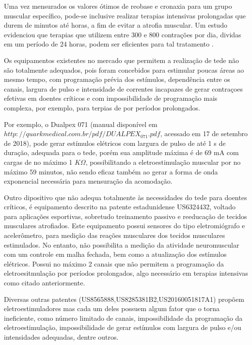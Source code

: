 Uma vez mensurados os valores ótimos de reobase e cronaxia para um grupo muscular específico, pode-se inclusive realizar terapias intensivas prolongadas que durem de minutos até horas, a fim de evitar a atrofia muscular. Um estudo evidenciou que terapias que utilizem entre 300 e 800 contrações por dia, dividas em um período de 24 horas, podem ser eficientes para tal tratamento .

Os equipamentos existentes no mercado que permitem a realização de \ac{tede} não são totalmente adequados, pois foram concebidos para estimular poucas áreas ao mesmo tempo, com programação prévia dos estímulos, dependência entre os canais, largura de pulso e intensidade de correntes incapazes de gerar contraçoes efetivas em doentes críticos e com impossibilidade de programação mais complexa, por exemplo, para terpias de por períodos prolongados. 

Por exemplo, o Dualpex 071 (manual disponível em $http://quarkmedical.com.br/pdf/DUALPEX_071.pdf$, acessado em 17 de setembro de 2018), pode gerar estímulos elétricos com largura de pulso de até 1 s de duração, adequada para o \ac{tede}, porém sua amplitude máxima é de 69 mA com cargas de no máximo 1 $K\Omega$, possibilitando a eletroestimulação muscular por no máximo 59 minutos, não sendo eficaz também ao gerar a forma de onda exponencial necessária para mensuração da acomodação.

Outro dipositivo que não adequa totalmente às necessidades do \ac{tede} para doentes críticos, é equipamento descrito na patente estadunidense US6324432, voltado para aplicações esportivas, sobretudo treinamento passivo e reeducação de tecidos musculares atrofiados. Este equipamento possui sensores do tipo eletromiógrafo e acelerômetro, para medição das reações musculares dos tecidos musculares estimulados. No entanto, não possibilita a medição da atividade neuromuscular com um controle em malha fechada, bem como a atualização dos estímulos elétricos. Possui no máximo 2 canais que não permitem a programação da eletroesitmulação por períodos prolongados, algo necessário em terapias intensivas como citado anteriormente.

Diversas outras patentes (US8565888,US8285381B2,US20160051817A1) propõem eletroestimuladores mas cada um deles possuem algum fator que o torna ineficiente, como número limitado de canais, impossibilidade da programação da eletroestimulação, impossibilidade de gerar estímulos com largura de pulso e/ou intensidades adequadas, dentre outros.

